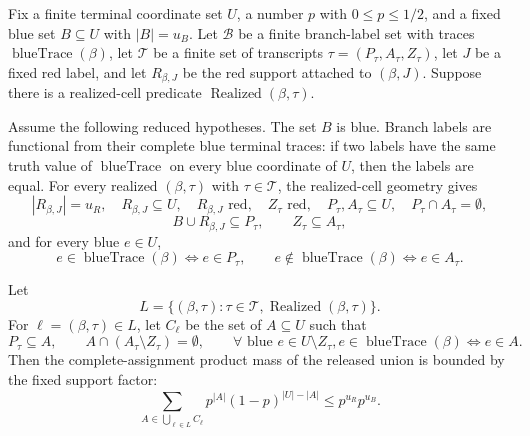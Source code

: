 \begin{helper}
Fix a finite terminal coordinate set \(U\), a number \(p\) with
\(0\le p\le 1/2\), and a fixed blue set \(B\subseteq U\) with
\(|B|=u_B\).  Let \(\mathcal B\) be a finite branch-label set with traces
\(\operatorname{blueTrace}(\beta)\), let \(\mathcal T\) be a finite set of
transcripts \(\tau=(P_\tau,A_\tau,Z_\tau)\), let \(J\) be a fixed red label,
and let \(R_{\beta,J}\) be the red support attached to \((\beta,J)\).  Suppose
there is a realized-cell predicate \(\operatorname{Realized}(\beta,\tau)\).

Assume the following reduced hypotheses.  The set \(B\) is blue.  Branch labels
are functional from their complete blue terminal traces: if two labels have
the same truth value of \(\operatorname{blueTrace}\) on every blue coordinate
of \(U\), then the labels are equal.  For every realized \((\beta,\tau)\) with
\(\tau\in\mathcal T\), the realized-cell geometry gives
\[
|R_{\beta,J}|=u_R,\quad R_{\beta,J}\subseteq U,\quad
R_{\beta,J}\text{ red},\quad Z_\tau\text{ red},\quad
P_\tau,A_\tau\subseteq U,\quad P_\tau\cap A_\tau=\emptyset,
\]
\[
B\cup R_{\beta,J}\subseteq P_\tau,\qquad Z_\tau\subseteq A_\tau,
\]
and for every blue \(e\in U\),
\[
e\in\operatorname{blueTrace}(\beta)\Longleftrightarrow e\in P_\tau,
\qquad
e\notin\operatorname{blueTrace}(\beta)\Longleftrightarrow e\in A_\tau .
\]

Let
\[
L=\{(\beta,\tau):\tau\in\mathcal T,
      \operatorname{Realized}(\beta,\tau)\}.
\]
For \(\ell=(\beta,\tau)\in L\), let \(C_\ell\) be the set of
\(A\subseteq U\) such that
\[
P_\tau\subseteq A,\qquad
A\cap(A_\tau\setminus Z_\tau)=\emptyset,\qquad
\forall\text{ blue }e\in U\setminus Z_\tau,
  e\in\operatorname{blueTrace}(\beta)\Longleftrightarrow e\in A .
\]
Then the complete-assignment product mass of the released union is bounded by
the fixed support factor:
\[
\sum_{A\in\bigcup_{\ell\in L}C_\ell}p^{|A|}(1-p)^{|U|-|A|}
\le p^{u_R}p^{u_B}.
\]
\end{helper}
